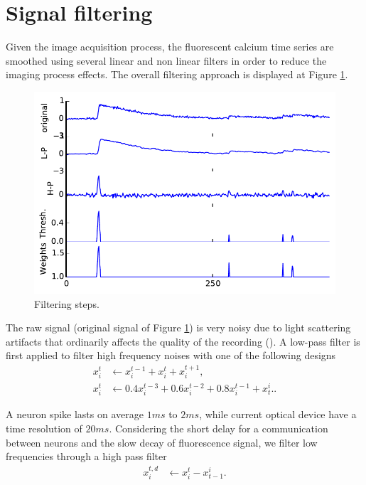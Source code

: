 \documentclass[wcp]{jmlr}
\begin{document}
\section{Signal filtering} \label{sec:filter}

Given the image acquisition process, the fluorescent calcium time series
are smoothed using several linear and non linear filters in
order to reduce the imaging process effects. The overall filtering approach
is displayed at Figure \ref{fig:filtered-signal}.

\begin{figure}[bth]
\centering
\includegraphics[width=0.8\linewidth]{images/fig_filtering}
\caption{Filtering steps.}
\label{fig:filtered-signal}
\end{figure}

The raw signal (original signal of Figure \ref{fig:filtered-signal}) is very noisy
due to light scattering artifacts that ordinarily affects the quality of the
recording (\cite{lichtman2011big}). A low-pass filter is first applied to
filter high frequency noises with one of the following designs
\begin{align}
x^t_i &\leftarrow x^{t-1}_i + x^{t}_i + x^{t+1}_i \label{eq:symetric-median}, \\
x^t_i &\leftarrow 0.4 x^{t-3}_i + 0.6 x^{t-2}_i + 0.8 x^{t-1}_i + x_{t}^i.
\label{eq:weighted-asymetric-median}.
\end{align}

A neuron spike lasts on average $1ms$ to $2ms$, while current optical
device have a time resolution of $20ms$. Considering the short delay for a
communication between neurons and the slow decay of fluorescence signal, we
filter low frequencies through a high pass filter
\begin{align}
x^{t,d}_{i} &\leftarrow x^{t}_i - x_{t-1}^i. \label{eq:high-pass-filter}
\end{align}
\end{document}
